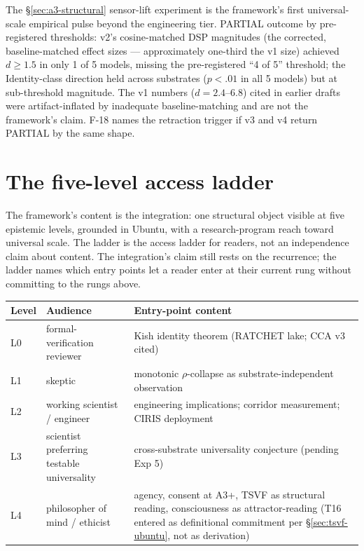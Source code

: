 \documentclass[11pt,a4paper]{article}
\begin{document}
The \S\ref{sec:a3-structural} sensor-lift experiment is the framework's first universal-scale empirical pulse beyond the engineering tier. PARTIAL outcome by pre-registered thresholds: v2's cosine-matched DSP magnitudes (the corrected, baseline-matched effect sizes --- approximately one-third the v1 size) achieved $d \ge 1.5$ in only 1 of 5 models, missing the pre-registered ``4 of 5'' threshold; the Identity-class direction held across substrates ($p < .01$ in all 5 models) but at sub-threshold magnitude. The v1 numbers ($d = 2.4$--$6.8$) cited in earlier drafts were artifact-inflated by inadequate baseline-matching and are not the framework's claim. F-18 names the retraction trigger if v3 and v4 return PARTIAL by the same shape.

\section{The five-level access ladder}\label{sec:ladder}

The framework's content is the integration: one structural object visible at five epistemic levels, grounded in Ubuntu, with a research-program reach toward universal scale. The ladder is the access ladder for readers, not an independence claim about content. The integration's claim still rests on the recurrence; the ladder names which entry points let a reader enter at their current rung without committing to the rungs above.

\begin{center}
\begin{tabular}{@{}l p{5cm} p{9.2cm}@{}}
\toprule
Level & Audience & Entry-point content \\
\midrule
L0 & formal-verification reviewer & Kish identity theorem (RATCHET lake; CCA v3 cited) \\
L1 & skeptic & monotonic $\rho$-collapse as substrate-independent observation \\
L2 & working scientist / engineer & engineering implications; corridor measurement; CIRIS deployment \\
L3 & scientist preferring testable universality & cross-substrate universality conjecture (pending Exp 5) \\
L4 & philosopher of mind / ethicist & agency, consent at A3+, TSVF as structural reading, consciousness as attractor-reading (T16 entered as definitional commitment per \S\ref{sec:tsvf-ubuntu}, not as derivation) \\
\bottomrule
\end{tabular}
\end{center}
\end{document}

